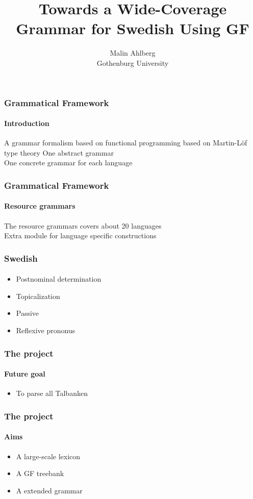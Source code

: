 \documentclass[10pt]{beamer}
\title{Towards a Wide-Coverage Grammar for Swedish Using GF}
\author{Malin Ahlberg \\ Gothenburg University}
\date{}
\begin{document}
\maketitle

 \begin{frame}
  \frametitle{Grammatical Framework}
  \framesubtitle{Introduction}
  A grammar formalism based on functional programming 
  based on Martin-Löf type theory
  \vspace{5mm}
  \pause
  One abstract grammar \\
  \pause
  One concrete grammar for each language \\
 \end{frame}

 \begin{frame}
  \frametitle{Grammatical Framework}
  \framesubtitle{Resource grammars}
  The resource grammars covers about 20 languages \\
  \vspace{5mm}
  \pause
  Extra module for language specific constructions
 \end{frame}

\begin{frame}
\frametitle{Swedish}
\framesubtitle{} 
\begin{itemize}
\item{Postnominal determination}
\item{Topicalization}
\item{Passive}
\item{Reflexive prononus}
\end{itemize}
\end{frame}

\begin{frame}
\frametitle{The project}
\framesubtitle{Future goal} 
\begin{itemize}
\item{To parse all Talbanken}
\end{itemize}
\end{frame}



\begin{frame}
\frametitle{The project}
\framesubtitle{Aims} 
\begin{itemize}
\item{A large-scale lexicon}
\item{A GF treebank}
\item{A extended grammar}
\end{itemize}
\end{frame}
\end{document}
